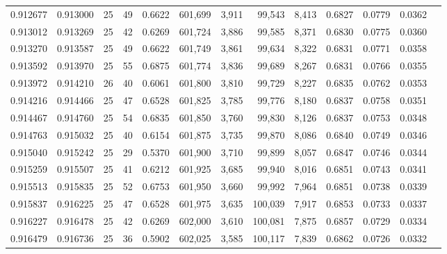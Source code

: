 \begin{tabular}{rrrrrrrrrrrrr}
0.912677 & 0.913000 &    25 &  49 &                                     0.6622 & 601,699 &   3,911 &  99,543 &   8,413 & 0.6827 & 0.0779 & 0.0362 \\
0.913012 & 0.913269 &    25 &  42 &                                     0.6269 & 601,724 &   3,886 &  99,585 &   8,371 & 0.6830 & 0.0775 & 0.0360 \\
0.913270 & 0.913587 &    25 &  49 &                                     0.6622 & 601,749 &   3,861 &  99,634 &   8,322 & 0.6831 & 0.0771 & 0.0358 \\
0.913592 & 0.913970 &    25 &  55 &                                     0.6875 & 601,774 &   3,836 &  99,689 &   8,267 & 0.6831 & 0.0766 & 0.0355 \\
0.913972 & 0.914210 &    26 &  40 &                                     0.6061 & 601,800 &   3,810 &  99,729 &   8,227 & 0.6835 & 0.0762 & 0.0353 \\
0.914216 & 0.914466 &    25 &  47 &                                     0.6528 & 601,825 &   3,785 &  99,776 &   8,180 & 0.6837 & 0.0758 & 0.0351 \\
0.914467 & 0.914760 &    25 &  54 &                                     0.6835 & 601,850 &   3,760 &  99,830 &   8,126 & 0.6837 & 0.0753 & 0.0348 \\
0.914763 & 0.915032 &    25 &  40 &                                     0.6154 & 601,875 &   3,735 &  99,870 &   8,086 & 0.6840 & 0.0749 & 0.0346 \\
0.915040 & 0.915242 &    25 &  29 &                                     0.5370 & 601,900 &   3,710 &  99,899 &   8,057 & 0.6847 & 0.0746 & 0.0344 \\
0.915259 & 0.915507 &    25 &  41 &                                     0.6212 & 601,925 &   3,685 &  99,940 &   8,016 & 0.6851 & 0.0743 & 0.0341 \\
0.915513 & 0.915835 &    25 &  52 &                                     0.6753 & 601,950 &   3,660 &  99,992 &   7,964 & 0.6851 & 0.0738 & 0.0339 \\
0.915837 & 0.916225 &    25 &  47 &                                     0.6528 & 601,975 &   3,635 & 100,039 &   7,917 & 0.6853 & 0.0733 & 0.0337 \\
0.916227 & 0.916478 &    25 &  42 &                                     0.6269 & 602,000 &   3,610 & 100,081 &   7,875 & 0.6857 & 0.0729 & 0.0334 \\
0.916479 & 0.916736 &    25 &  36 &                                     0.5902 & 602,025 &   3,585 & 100,117 &   7,839 & 0.6862 & 0.0726 & 0.0332 \\

\end{tabular}
